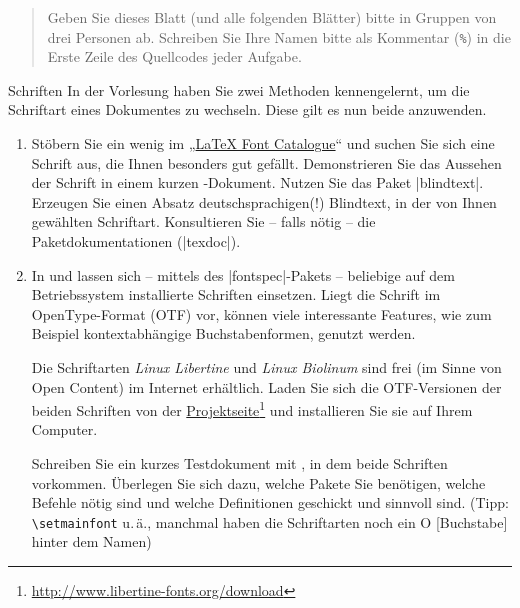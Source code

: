 \documentclass[
	vorläufig=false, 
	blattnr=1,
	ausgabe=2022-10-17,
	abgabe=2022-10-26,
	lösung=true,
	shortverb,
]{../tex/latexkurs-exercise}
\begin{document}
\begin{abstract}
	\noindent Geben Sie dieses Blatt (und alle folgenden Blätter) bitte in Gruppen von drei Personen ab. Schreiben Sie Ihre Namen bitte als Kommentar (\texttt{\%}) in die Erste Zeile des Quellcodes jeder Aufgabe.
\end{abstract}

\begin{aufgabe}[6]{Schriften}
	In der Vorlesung haben Sie zwei Methoden kennengelernt, um die Schriftart eines Dokumentes zu wechseln.
	Diese gilt es nun beide anzuwenden.
	\begin{enumerate}[label=\alph*)]
		\item Stöbern Sie ein wenig im „\href{http://www.tug.dk/FontCatalogue/}{LaTeX Font Catalogue}“ und suchen Sie sich eine Schrift aus, die Ihnen besonders gut gefällt. Demonstrieren Sie das Aussehen der Schrift in einem kurzen -Dokument. Nutzen Sie das Paket |blindtext|. Erzeugen Sie einen Absatz deutschsprachigen(!) Blindtext, in der von Ihnen gewählten Schriftart. Konsultieren Sie – falls nötig – die Paketdokumentationen (|texdoc|).
		\item In  und  lassen sich – mittels des |fontspec|-Pakets – beliebige auf dem Betriebssystem installierte Schriften einsetzen. Liegt die Schrift im OpenType-Format (OTF) vor, können viele interessante Features, wie zum Beispiel kontextabhängige Buchstabenformen, genutzt werden.
		
		Die Schriftarten \emph{Linux Libertine} und \emph{Linux Biolinum} sind frei (im Sinne von Open Content) im Internet erhältlich. Laden Sie sich die OTF-Versionen der beiden Schriften von der \href{http://libertine-fonts.org/download}{Projektseite}\footnote{\url{http://www.libertine-fonts.org/download}} und installieren Sie sie auf Ihrem Computer.
		
		Schreiben Sie ein kurzes Testdokument mit , in dem beide Schriften vorkommen. Überlegen Sie sich dazu, welche Pakete Sie benötigen, welche Befehle nötig sind und welche Definitionen geschickt und sinnvoll sind. (Tipp: \texttt{\textbackslash setmainfont} u.\,ä., manchmal haben die Schriftarten noch ein O [Buchstabe] hinter dem Namen)
	\end{enumerate}
\end{aufgabe}

\end{document}
